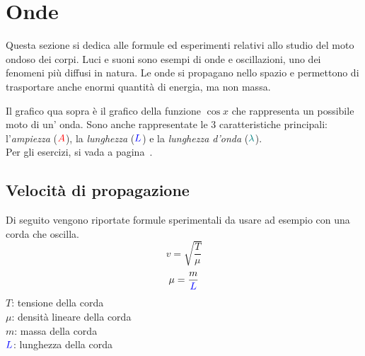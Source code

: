 
\section{Onde}\label{sec:onde}
Questa sezione si dedica alle formule ed esperimenti relativi allo studio del moto ondoso dei 
corpi. Luci e suoni sono esempi di onde e oscillazioni, uno dei fenomeni più diffusi in
natura. Le onde si propagano nello spazio e permettono di trasportare anche enormi quantità di
energia, ma non massa.

\begin{center}
\end{center}
Il grafico qua sopra è il grafico della funzione $\cos x$ che rappresenta un possibile moto di un'
onda. Sono anche rappresentate le 3 caratteristiche principali: l'\emph{ampiezza}
($\mathcolor{red}{A}$), la \emph{lunghezza} ($\mathcolor{blue}{L}$) e la \emph{lunghezza d'onda}
($\mathcolor{teal}{\lambda}$).\\[\baselineskip]
Per gli esercizi, si vada a pagina~\pageref{ex:onde}.

\subsection{Velocità di propagazione} \label{subsec:onde:sper}
Di seguito vengono riportate formule sperimentali da usare ad esempio con una corda che oscilla.
\begin{equation*}
  v = \sqrt{\frac{T}{\mu}}
\end{equation*}
\begin{equation*}
  \mu = \frac{m}{\mathcolor{blue}{L}}
\end{equation*}
$T$: tensione della corda\\
$\mu$: densità lineare della corda\\
$m$: massa della corda\\
$\mathcolor{blue}{L}$: lunghezza della corda

